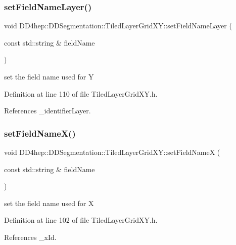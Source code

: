 \subsubsection{\texorpdfstring{set\+Field\+Name\+Layer()}{setFieldNameLayer()}}
{\footnotesize\ttfamily void D\+D4hep\+::\+D\+D\+Segmentation\+::\+Tiled\+Layer\+Grid\+X\+Y\+::set\+Field\+Name\+Layer (\begin{DoxyParamCaption}\item[{const std\+::string \&}]{field\+Name }\end{DoxyParamCaption})\hspace{0.3cm}{\ttfamily [inline]}}



set the field name used for Y 



Definition at line 110 of file Tiled\+Layer\+Grid\+X\+Y.\+h.



References \+\_\+identifier\+Layer.

\hypertarget{class_d_d4hep_1_1_d_d_segmentation_1_1_tiled_layer_grid_x_y_a1e0e7dc80968a2a7513cdd974275e5d5}{}\label{class_d_d4hep_1_1_d_d_segmentation_1_1_tiled_layer_grid_x_y_a1e0e7dc80968a2a7513cdd974275e5d5} 
\subsubsection{\texorpdfstring{set\+Field\+Name\+X()}{setFieldNameX()}}
{\footnotesize\ttfamily void D\+D4hep\+::\+D\+D\+Segmentation\+::\+Tiled\+Layer\+Grid\+X\+Y\+::set\+Field\+NameX (\begin{DoxyParamCaption}\item[{const std\+::string \&}]{field\+Name }\end{DoxyParamCaption})\hspace{0.3cm}{\ttfamily [inline]}}



set the field name used for X 



Definition at line 102 of file Tiled\+Layer\+Grid\+X\+Y.\+h.



References \+\_\+x\+Id.

